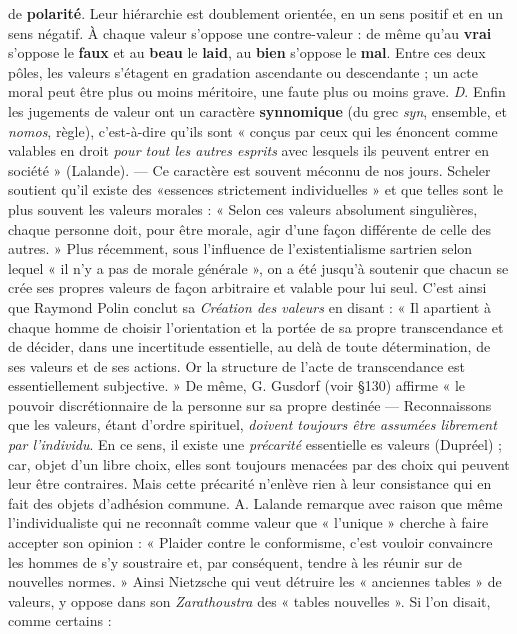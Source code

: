 de {\bf polarité}. Leur hiérarchie est doublement orientée, en un sens
positif et en un sens négatif. À chaque valeur s'oppose une
contre-valeur : de même qu’au {\bf vrai} s'oppose le {\bf faux} et au {\bf beau} le {\bf laid}, au {\bf bien}
s’oppose le {\bf mal}. Entre ces deux pôles, les valeurs s’étagent en
gradation ascendante ou descendante ; un acte moral peut être plus
ou moins méritoire, une faute plus ou moins grave.
{\it D}. Enfin les jugements de valeur ont un caractère {\bf synnomique}
(du grec {\it syn}, ensemble, et {\it nomos}, règle), c’est-à-dire
qu'ils sont « conçus par ceux qui les énoncent comme valables en droit
{\it pour tout les autres esprits}
avec lesquels ils peuvent entrer en société » (Lalande).
— Ce caractère est souvent méconnu de nos jours. Scheler soutient
qu’il existe des «essences strictement individuelles » et que telles
sont le plus souvent les valeurs morales : « Selon ces valeurs
absolument singulières, chaque personne doit, pour être morale, agir d'une
façon différente de celle des autres. » Plus récemment, sous l’influence
de l’existentialisme sartrien selon lequel « il n’y a pas de morale
générale », on a été jusqu’à soutenir que chacun se crée ses propres
valeurs de façon arbitraire et valable pour lui seul. C'est ainsi que
Raymond Polin conclut sa {\it Création des valeurs} en disant : « Il
apartient à chaque homme de choisir l'orientation et la portée de sa
propre transcendance et de décider, dans une incertitude essentielle,
au delà de toute détermination, de ses valeurs et de ses actions. Or la
structure de l’acte de transcendance est essentiellement subjective. »
De même, G. Gusdorf (voir \S 130) affirme « le pouvoir discrétionnaire
de la personne sur sa propre destinée — Reconnaissons que les
valeurs, étant d’ordre spirituel, {\it doivent toujours être assumées librement
par l'individu}. En ce sens, il existe une {\it précarité} essentielle es
valeurs (Dupréel) ; car, objet d’un libre choix, elles sont toujours
menacées par des choix qui peuvent leur être contraires. Mais cette
précarité n’enlève rien à leur consistance qui en fait des objets d'adhésion
commune. A. Lalande remarque avec raison que même l’individualiste
qui ne reconnaît comme valeur que « l’unique » cherche
à faire accepter son opinion : « Plaider contre le conformisme, c’est
vouloir convaincre les hommes de s’y soustraire et, par conséquent,
tendre à les réunir sur de nouvelles normes. » Ainsi Nietzsche qui
veut détruire les « anciennes tables » de valeurs, y oppose dans son
{\it Zarathoustra} des « tables nouvelles ». Si l'on disait, comme certains :

